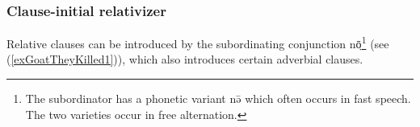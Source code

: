\documentclass[10pt,twoside]{article}
\def\ci#1{{\ipaFont #1}}
\newcommand{\gl}[1]{`#1'}
\def\VSP{\vspace{0pt}}
\newcommand{\pref}[1]{(\ref{#1})}
\def\elicited{$^\diamond$}
\newcommand{\comment}[1]{\textcolor{blue}{\emph{#1}}}
\begin{document}
%
%
%

%

\subsubsection{Clause-initial relativizer}
Relative clauses can be introduced by the subordinating conjunction \ci{nō̤}\footnote{The 
subordinator has a phonetic variant \ci{nə̄} which often occurs in fast speech. The two 
varieties occur in free alternation.} (see \pref{exGoatTheyKilled1}), which also 
introduces certain adverbial clauses.
\end{document}

